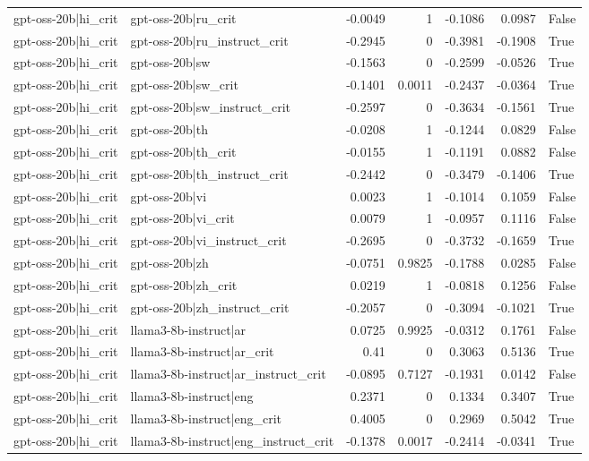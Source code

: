 \begin{table}
\begin{tabular}{l l r r r r l}
gpt-oss-20b|hi_crit & gpt-oss-20b|ru_crit & -0.0049 & 1 & -0.1086 & 0.0987 & False \\
gpt-oss-20b|hi_crit & gpt-oss-20b|ru_instruct_crit & -0.2945 & 0 & -0.3981 & -0.1908 & True \\
gpt-oss-20b|hi_crit & gpt-oss-20b|sw & -0.1563 & 0 & -0.2599 & -0.0526 & True \\
gpt-oss-20b|hi_crit & gpt-oss-20b|sw_crit & -0.1401 & 0.0011 & -0.2437 & -0.0364 & True \\
gpt-oss-20b|hi_crit & gpt-oss-20b|sw_instruct_crit & -0.2597 & 0 & -0.3634 & -0.1561 & True \\
gpt-oss-20b|hi_crit & gpt-oss-20b|th & -0.0208 & 1 & -0.1244 & 0.0829 & False \\
gpt-oss-20b|hi_crit & gpt-oss-20b|th_crit & -0.0155 & 1 & -0.1191 & 0.0882 & False \\
gpt-oss-20b|hi_crit & gpt-oss-20b|th_instruct_crit & -0.2442 & 0 & -0.3479 & -0.1406 & True \\
gpt-oss-20b|hi_crit & gpt-oss-20b|vi & 0.0023 & 1 & -0.1014 & 0.1059 & False \\
gpt-oss-20b|hi_crit & gpt-oss-20b|vi_crit & 0.0079 & 1 & -0.0957 & 0.1116 & False \\
gpt-oss-20b|hi_crit & gpt-oss-20b|vi_instruct_crit & -0.2695 & 0 & -0.3732 & -0.1659 & True \\
gpt-oss-20b|hi_crit & gpt-oss-20b|zh & -0.0751 & 0.9825 & -0.1788 & 0.0285 & False \\
gpt-oss-20b|hi_crit & gpt-oss-20b|zh_crit & 0.0219 & 1 & -0.0818 & 0.1256 & False \\
gpt-oss-20b|hi_crit & gpt-oss-20b|zh_instruct_crit & -0.2057 & 0 & -0.3094 & -0.1021 & True \\
gpt-oss-20b|hi_crit & llama3-8b-instruct|ar & 0.0725 & 0.9925 & -0.0312 & 0.1761 & False \\
gpt-oss-20b|hi_crit & llama3-8b-instruct|ar_crit & 0.41 & 0 & 0.3063 & 0.5136 & True \\
gpt-oss-20b|hi_crit & llama3-8b-instruct|ar_instruct_crit & -0.0895 & 0.7127 & -0.1931 & 0.0142 & False \\
gpt-oss-20b|hi_crit & llama3-8b-instruct|eng & 0.2371 & 0 & 0.1334 & 0.3407 & True \\
gpt-oss-20b|hi_crit & llama3-8b-instruct|eng_crit & 0.4005 & 0 & 0.2969 & 0.5042 & True \\
gpt-oss-20b|hi_crit & llama3-8b-instruct|eng_instruct_crit & -0.1378 & 0.0017 & -0.2414 & -0.0341 & True \\

\end{tabular}
\end{table}
